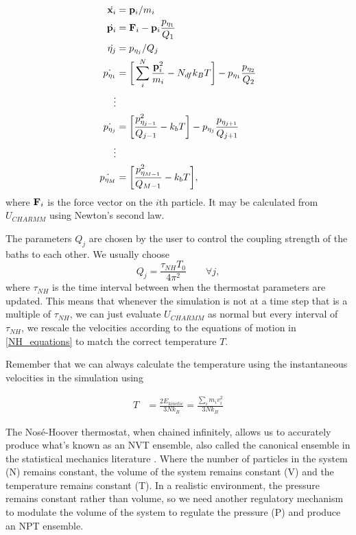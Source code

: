 \begin{equation}
	\begin{aligned}
		\dot{\bold{x}_i} &= \bold{p}_i/m_i \\
		\dot{\bold{p}_i} &= \bold{F}_i-\bold{p}_i\frac{p_{\eta_1}}{Q_1} \\
		\dot{\eta_j} &= p_{\eta_j}/Q_j \\
		\dot{p_{\eta_1}} &= \bigg[\sum_i^N \frac{\bold{p}_i^2}{m_i} - N_{df} k_B T\bigg]  - p_{\eta_1}\frac{p_{\eta_2}}{Q_2} \\ 
		\vdots \\ 
		\dot{p_{\eta_j}} &= \bigg[ \frac{p^2_{\eta_{j-1}}}{Q_{j-1}} - k_bT \bigg]  - p_{\eta_{j}}\frac{p_{\eta_{j+1}}}{Q_{j+1}} \\ 
		\vdots \\ 
		\dot{p_{\eta_M}} &= \bigg[ \frac{p^2_{\eta_{M-1}}}{Q_{M-1}} - k_bT \bigg],
	\end{aligned}
	\label{NH_equations}
\end{equation}
where $\bold{F}_i$ is the force vector on the $i$th particle. It may be calculated from $U_{CHARMM}$ using Newton's second law. 

The parameters $Q_j$ are chosen by the user to control the coupling strength of the baths to each other. We usually choose   
\begin{equation}
	Q_j = \frac{\tau_{NH}T_0}{4\pi^2}\qquad  \forall j,
\end{equation}
where $\tau_{NH}$ is the time interval between when the thermostat parameters are updated. This means that whenever the simulation is not at a time step that is a multiple of $\tau_{NH}$,  we can just evaluate $U_{CHARMM}$ as normal but every interval of $\tau_{NH}$, we rescale the velocities according to the equations of motion in \ref{NH_equations} to match the correct temperature $T$.

Remember that we can always calculate the temperature using the instantaneous velocities in the simulation using

\begin{equation}
	\begin{aligned}
		T &= \frac{2E_{kinetic}}{3Nk_B}  =  \frac{\sum_i m_i v_i^2}{3Nk_B} 
	\end{aligned}
\end{equation}
	
The Nos\'e-Hoover thermostat, when chained infinitely, allows us to  accurately produce what's known as an NVT ensemble, also called the canonical ensemble in the statistical mechanics literature \cite{martyna1992}. Where the number of particles in the system (N) remains constant, the volume of the system remains constant (V) and the temperature remains constant (T). In a realistic environment, the pressure remains constant rather than volume, so we need another regulatory mechanism to modulate the volume of the system to regulate the pressure (P) and produce an NPT ensemble. 

